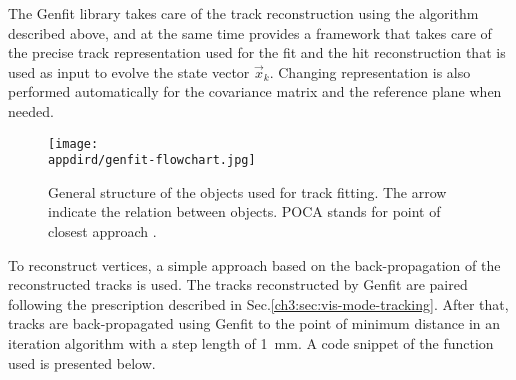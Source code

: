 The Genfit library takes care of the track reconstruction using the algorithm described above, and at the same time provides a framework that takes care of the precise track representation used for the fit and the hit reconstruction that is used as input to evolve the state vector $\vec{x}_k$. Changing representation is also performed automatically for the covariance matrix and the reference plane when needed.


\begin{figure}[bth!]
  \centering
  \texttt{[image: \\appdird/genfit-flowchart.jpg]}
  \caption[genfit flow diagram]{General structure of the objects used for track fitting. The arrow indicate the relation between objects. POCA stands for point of closest approach \cite{genfit}.}
  \label{fig:genfit-diag}
\end{figure}

To reconstruct vertices, a simple approach based on the back-propagation of the reconstructed tracks is used. The tracks reconstructed by Genfit are paired following the prescription described in Sec.\ref{ch3:sec:vis-mode-tracking}. After that, tracks are back-propagated using Genfit to the point of minimum distance in an iteration algorithm with a step length of \SI{1}{\milli\meter}. A code snippet of the function used is presented below.

